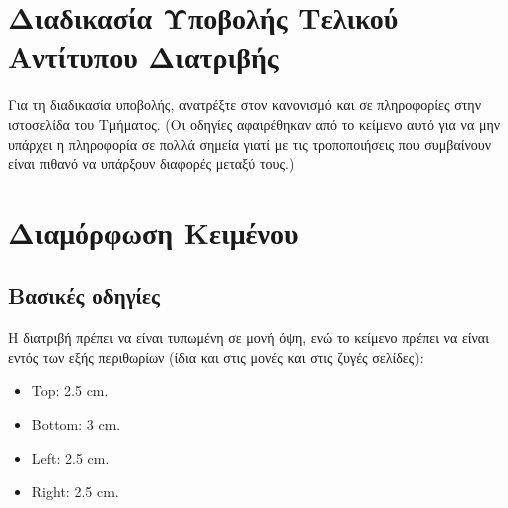 \section{Διαδικασία Υποβολής Τελικού Αντίτυπου Διατριβής}
\label{sec:Submission}
Για τη διαδικασία υποβολής, ανατρέξτε στον κανονισμό και σε πληροφορίες στην 
ιστοσελίδα του Τμήματος.
(Οι οδηγίες αφαιρέθηκαν από το κείμενο αυτό για να μην υπάρχει η πληροφορία 
σε πολλά σημεία γιατί με τις τροποποιήσεις που συμβαίνουν είναι πιθανό να 
υπάρξουν διαφορές μεταξύ τους.)



\section{Διαμόρφωση Κειμένου}
\label{sec:Text}

\subsection{Βασικές οδηγίες}
\label{subsec:Basic}


Η διατριβή πρέπει να είναι τυπωμένη σε μονή όψη, ενώ το κείμενο πρέπει να είναι εντός των εξής περιθωρίων (ίδια και στις μονές και στις ζυγές σελίδες):
\begin{itemize}
	\item Top: 2.5 cm.
	\item Bottom: 3 cm.
	\item Left: 2.5 cm.
	\item Right: 2.5 cm.
\end{itemize}

